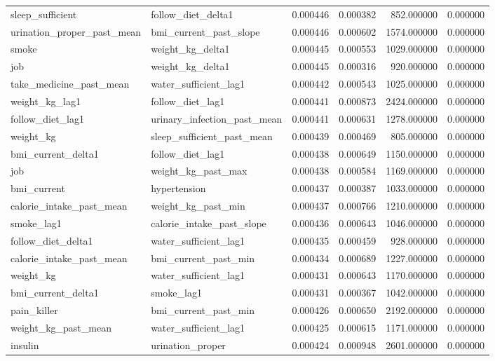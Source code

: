 \begin{longtable}{llrrrr}
sleep\_sufficient & follow\_diet\_delta1 & 0.000446 & 0.000382 & 852.000000 & 0.000000 \\
urination\_proper\_past\_mean & bmi\_current\_past\_slope & 0.000446 & 0.000602 & 1574.000000 & 0.000000 \\
smoke & weight\_kg\_delta1 & 0.000445 & 0.000553 & 1029.000000 & 0.000000 \\
job & weight\_kg\_delta1 & 0.000445 & 0.000316 & 920.000000 & 0.000000 \\
take\_medicine\_past\_mean & water\_sufficient\_lag1 & 0.000442 & 0.000543 & 1025.000000 & 0.000000 \\
weight\_kg\_lag1 & follow\_diet\_lag1 & 0.000441 & 0.000873 & 2424.000000 & 0.000000 \\
follow\_diet\_lag1 & urinary\_infection\_past\_mean & 0.000441 & 0.000631 & 1278.000000 & 0.000000 \\
weight\_kg & sleep\_sufficient\_past\_mean & 0.000439 & 0.000469 & 805.000000 & 0.000000 \\
bmi\_current\_delta1 & follow\_diet\_lag1 & 0.000438 & 0.000649 & 1150.000000 & 0.000000 \\
job & weight\_kg\_past\_max & 0.000438 & 0.000584 & 1169.000000 & 0.000000 \\
bmi\_current & hypertension & 0.000437 & 0.000387 & 1033.000000 & 0.000000 \\
calorie\_intake\_past\_mean & weight\_kg\_past\_min & 0.000437 & 0.000766 & 1210.000000 & 0.000000 \\
smoke\_lag1 & calorie\_intake\_past\_slope & 0.000436 & 0.000643 & 1046.000000 & 0.000000 \\
follow\_diet\_delta1 & water\_sufficient\_lag1 & 0.000435 & 0.000459 & 928.000000 & 0.000000 \\
calorie\_intake\_past\_mean & bmi\_current\_past\_min & 0.000434 & 0.000689 & 1227.000000 & 0.000000 \\
weight\_kg & water\_sufficient\_lag1 & 0.000431 & 0.000643 & 1170.000000 & 0.000000 \\
bmi\_current\_delta1 & smoke\_lag1 & 0.000431 & 0.000367 & 1042.000000 & 0.000000 \\
pain\_killer & bmi\_current\_past\_min & 0.000426 & 0.000650 & 2192.000000 & 0.000000 \\
weight\_kg\_past\_mean & water\_sufficient\_lag1 & 0.000425 & 0.000615 & 1171.000000 & 0.000000 \\
insulin & urination\_proper & 0.000424 & 0.000948 & 2601.000000 & 0.000000 \\

\end{longtable}
